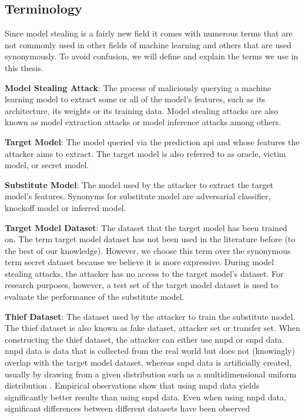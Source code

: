 \subsection{Terminology}
\label{sec:ModelStealing:Terminology}
Since model stealing is a fairly new field it comes with numerous terms that are not commonly used in other fields of machine learning and others that are used 
synonymously. To avoid confusion, we will define and explain the terms we use in this thesis. \par
\textbf{Model Stealing Attack}: The process of maliciously querying a machine learning model to extract some or all of the model's features, such as its
architecture, its weights or its training data. Model stealing attacks are also known as model extraction attacks or model inference attacks among others. \par
\textbf{Target Model}: The model queried via the prediction \gls{api} and whose features the attacker aims to extract. The target model is also referred to as oracle, victim model, or secret model. \par
\textbf{Substitute Model}: The model used by the attacker to extract the target model's features. Synonyms for substitute model are adversarial classifier,
knockoff model or inferred model. \par
\textbf{Target Model Dataset}: The dataset that the target model has been trained on. The term target model dataset has not been used in the literature before (to 
the best of our knowledge). However, we choose this term over the synonymous term secret dataset because we believe it is more expressive. During model stealing attacks,
the attacker has no access to the target model's dataset. For research purposes, however, a test set of the target model dataset is
used to evaluate the performance of the substitute model. \par
\textbf{Thief Dataset}: The dataset used by the attacker to train the substitute model. The thief dataset is also known as fake dataset, attacker set or 
transfer set. When constructing the thief dataset, the attacker can either use \gls{nnpd} or \gls{snpd}
data. \gls{nnpd} data is data that is collected from the real world but does not (knowingly) overlap with the target model dataset, whereas \gls{snpd} data is artificially created,
usually by drawing from a given distribution such as a multidimensional uniform distribution \cite{pal2020activethief}. Empirical observations show that using \gls{nnpd} data
yields significantly better results than using \gls{snpd} data. Even when using \gls{nnpd} data, significant differences between different datasets have been observed 
